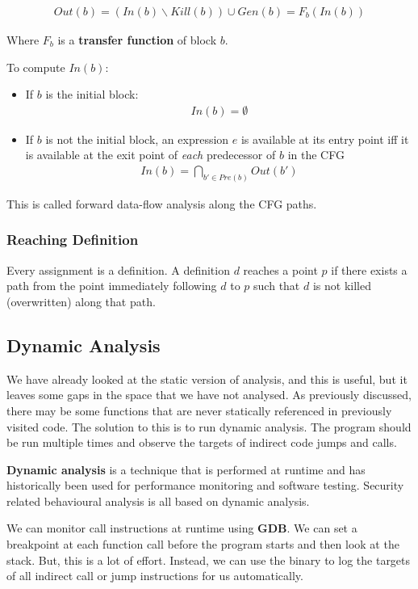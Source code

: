 \documentclass[11pt,a4paper,titlepage,dvipsnames,cmyk]{scrartcl}
\begin{document}
\begin{align*}
Out(b) = (In(b) \backslash Kill(b)) \cup Gen(b) = F_b(In(b))
\end{align*}

Where $F_b$ is a \textbf{transfer function} of block $b$.

To compute $In(b)$:
\begin{itemize}
    \item If $b$ is the initial block:
    \begin{align*}
    In(b) = \emptyset
    \end{align*}
    \item If $b$ is not the initial block, an expression $e$ is available at its entry point iff it is available at the exit point of {\color{red}\textit{each}} predecessor of $b$ in the CFG
    \begin{align*}
    In(b) = \bigcap_{b' \in Pre(b)} Out(b')
    \end{align*}
\end{itemize}

This is called forward data-flow analysis along the CFG paths.

\subsubsection{Reaching Definition}
Every assignment is a definition. A definition $d$ reaches a point $p$ if there exists a path from the point immediately following $d$ to $p$ such that $d$ is not killed (overwritten) along that path. 
\subsection{Dynamic Analysis}
We have already looked at the static version of analysis, and this is useful, but it leaves some gaps in the space that we have not analysed. As previously discussed, there may be some functions that are never statically referenced in previously visited code. The solution to this is to run dynamic analysis. The program should be run multiple times and observe the targets of indirect code jumps and calls.

\textbf{Dynamic analysis} is a technique that is performed at runtime and has historically been used for performance monitoring and software testing. Security related behavioural analysis is all based on dynamic analysis.

We can monitor call instructions at runtime using \textbf{GDB}. We can set a breakpoint at each function call before the program starts and then look at the stack. But, this is a lot of effort. Instead, we can use the binary to log the targets of all indirect call or jump instructions for us automatically.
\end{document}
